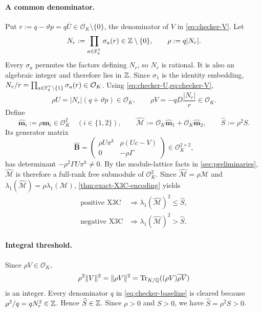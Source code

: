\paragraph{A common denominator.}
Put $r:=q-\vartheta p=q\overline U\in \mathcal{O}_K\setminus\{0\}$, the
denominator of $V$ in \cref{eq:checker-V}.  Let
\begin{equation*}
 N_r:=\prod_{a\in\mathbb F_q^\times}\sigma_a(r)
 \in\mathbb Z\setminus\{0\},
 \qquad
 \rho:=q|N_r|.
\end{equation*}
Every $\sigma_a$ permutes the factors defining $N_r$, so $N_r$ is
rational.  It is also an algebraic integer and therefore lies in $\mathbb Z$.
Since $\sigma_1$ is the identity embedding,
$N_r/r=\prod_{a\in\mathbb F_q^\times\setminus\{1\}}\sigma_a(r)\in \mathcal{O}_K$.
Using \cref{eq:checker-U,eq:checker-V},
\begin{equation}
\label{eq:cleared-UV-exact}
 \rho U=|N_r|(q+\vartheta p)\in \mathcal{O}_K,
 \qquad
 \rho V=-qD\frac{|N_r|}{r}\in \mathcal{O}_K.
\end{equation}
Define
\begin{equation}
\label{eq:integral-module-exact}
 \widehat{\mathbf m}_i:=\rho\mathbf m_i\in \mathcal{O}_K^2
 \quad(i\in\{1,2\}),
 \qquad
 \widehat{\mathcal M}
 :=\mathcal{O}_K\widehat{\mathbf m}_1+\mathcal{O}_K\widehat{\mathbf m}_2,
 \qquad
 \widehat S:=\rho^2S.
\end{equation}
Its generator matrix
\[
 \widehat{\mathbf B}=
 \begin{pmatrix}
  \rho U\pi^k&\rho(Uc-V)\\
  0&-\rho\Gamma
 \end{pmatrix}\in \mathcal{O}_K^{2\times2},
\]
has determinant $-\rho^2\Gamma U\pi^k\ne0$.  By the module-lattice
facts in \cref{sec:preliminaries}, $\widehat{\mathcal M}$ is therefore a
full-rank free submodule of $\mathcal{O}_K^2$.
Since $\widehat{\mathcal M}=\rho\mathcal M$ and
$\lambda_1(\widehat{\mathcal M})=\rho\lambda_1(\mathcal M)$,
\cref{thm:exact-X3C-encoding} yields
\begin{align}
\label{eq:scaled-exact-encoding}
 \text{positive X3C}&\Longrightarrow
 \lambda_1(\widehat{\mathcal M})^2\le\widehat S,
 \nonumber\\
 \text{negative X3C}&\Longrightarrow
 \lambda_1(\widehat{\mathcal M})^2>\widehat S.
\end{align}

\paragraph{Integral threshold.}
Since $\rho V\in\mathcal{O}_K$,
\[
 \rho^2\|V\|^2=\|\rho V\|^2
 =\operatorname{Tr}_{K/\mathbb Q}((\rho V)\overline{\rho V})
\]
is an integer.  Every denominator $q$ in \cref{eq:checker-baseline} is
cleared because $\rho^2/q=qN_r^2\in\mathbb Z$.  Hence $\widehat S\in\mathbb Z$.
Since $\rho>0$ and $S>0$, we have
$\widehat S=\rho^2S>0$.

